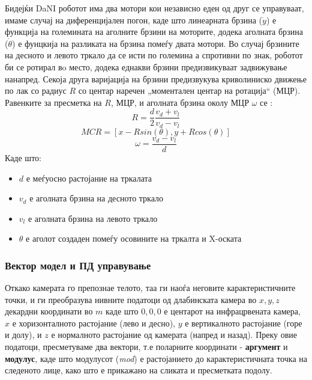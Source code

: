 \documentclass[12pt]{article}
\begin{document}
      Бидејќи DaNI роботот има два мотори кои независно еден од друг се управуваат, имаме случај на диференцијален погон, каде што линеарната брзина ($\dot y$) е функција на големината на аголните брзини на моторите, додека аголната брзина ($\dot \theta$) е фунцкија на разликата на брзина помеѓу двата мотори. Во случај брзините на десното и левото тркало да се исти по големина а спротивни по знак, роботот би се ротирал вo место, додека еднакви брзини предизвикуваат задвижување нанапред. Секоја друга варијација на брзини предизвукува криволиниско движење по лак со радиус $R$ со центар наречен „моментален центар на ротација“ (МЦР). Равенките за пресметка на $R$, МЦР, и аголната брзина околу МЦР $\omega$ се \cite{differential_drive_robots}:
      $$ R = \frac{d}{2} \frac{v_d + v_l}{v_d - v_l} $$
      $$ {MCR} = [x - Rsin(\theta), y + Rcos(\theta)] $$
      $$ \omega = \frac{v_d - v_l}{d} $$
      Каде што:
      \begin{itemize}
        \item $d$ е меѓуосно растојание на тркалата
        \item $v_d$ е аголната брзина на десното тркало
        \item $v_l$ е аголната брзина на левото тркало
        \item $\theta$ е аголот создаден помеѓу осовините на тркалта и X-оската
      \end{itemize}

    \subsubsection{Вектор модел и ПД управување}
    \label{sec:doublePD}

      Откако камерата го препознае телото, таа ги наоѓа неговите карактеристичните точки, и ги преобразува нивните податоци од длабинската камера во $ x,y,z $ декардни координати во $ m $ каде што $ 0,0,0 $ е центарот на инфрацрвената камера, $x$ е хоризонталното растојание (лево и десно), $y$ е вертикалното растојание (горе и долу), и $z$ е нормалното растојание од камерата (напред и назад). Преку овие податоци, пресметуваме два вектори, т.е поларните координати - \textbf{аргумент} и \textbf{модулус}, каде што модулусот (\textit{mod}) е растојанието до карактеристичната точка на следеното лице, како што е прикажано на сликата и пресметката подолу.
\end{document}
